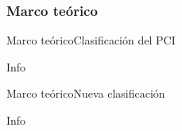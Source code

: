 %
%
%

\subsubsection{Marco teórico}

\begin{frame}{Marco teórico}{Clasificación del PCI}
  
  Info


\end{frame}

\begin{frame}{Marco teórico}{Nueva clasificación}
  
  Info


\end{frame}
